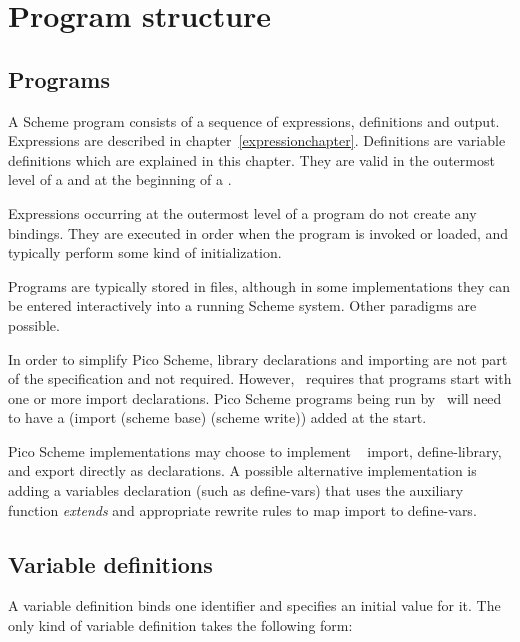 \chapter{Program structure}
\label{programchapter}

\section{Programs}

A Scheme program consists of a sequence of
expressions, definitions and output.
Expressions are described in chapter~\ref{expressionchapter}.
Definitions are variable definitions which are explained in this chapter.
They are valid in the outermost level of a 
and at the beginning of a .

Expressions occurring at the outermost level of a program
do not create any bindings.  They are
executed in order when the program is
invoked or loaded, and typically perform some kind of initialization.

Programs are typically stored in files, although
in some implementations they can be entered interactively into a running
Scheme system.  Other paradigms are possible.

\begin{note}
  In order to simplify Pico Scheme, library declarations and importing
  are not part of the specification and not required.  However,
  \rsevenrs\ requires that programs start with one or more import
  declarations. Pico Scheme programs being run by \rsevenrs\ will need
  to have a {\cf (import (scheme base) (scheme write))} added at the
  start.

  Pico Scheme implementations may choose to implement \rsevenrs\ {\cf
    import}, {\cf define-library}, and {\cf export} directly as
  declarations.  A possible alternative implementation is adding a
  variables declaration (such as {\cf define-vars}) that uses the
  auxiliary function {\it extends} and appropriate rewrite rules to
  map {\cf import} to {\cf define-vars}.
\end{note}

\section{Variable definitions}
\label{defines}

A variable definition binds one identifier and specifies an initial
value for it.
The only kind of variable definition
takes the following form:

